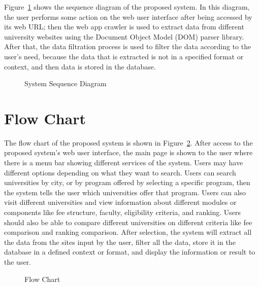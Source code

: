 Figure~\ref{fig:sys_seq} shows the sequence diagram of the proposed system. In this diagram, the user performs some action on the web user interface after being accessed by its web URL; then the web app crawler is used to extract data from different university websites using the Document Object Model (DOM) parser library. After that, the data filtration process is used to filter the data according to the user's need, because the data that is extracted is not in a specified format or context, and then data is stored in the database.

\begin{figure}[H]
    \centering
    \caption{System Sequence Diagram}
    \label{fig:sys_seq}
\end{figure}

\section{Flow Chart}

The flow chart of the proposed system is shown in Figure~\ref{fig:flowchart}. After access to the proposed system's web user interface, the main page is shown to the user where there is a menu bar showing different services of the system. Users may have different options depending on what they want to search. Users can search universities by city, or by program offered by selecting a specific program, then the system tells the user which universities offer that program. Users can also visit different universities and view information about different modules or components like fee structure, faculty, eligibility criteria, and ranking. Users should also be able to compare different universities on different criteria like fee comparison and ranking comparison. After selection, the system will extract all the data from the sites input by the user, filter all the data, store it in the database in a defined context or format, and display the information or result to the user.

\begin{figure}[H]
    \centering
    \caption{Flow Chart}
    \label{fig:flowchart}
\end{figure}
